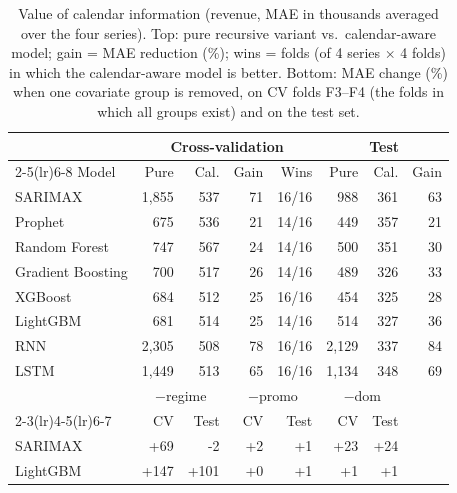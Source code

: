 \begin{table}[t]\centering
\caption{Value of calendar information (revenue, MAE in thousands averaged over the four series). Top: pure recursive variant vs.\ calendar-aware model; gain = MAE reduction (\%); wins = folds (of 4 series $\times$ 4 folds) in which the calendar-aware model is better. Bottom: MAE change (\%) when one covariate group is removed, on CV folds F3--F4 (the folds in which all groups exist) and on the test set.}\label{tab:ablation}
\footnotesize\setlength{\tabcolsep}{3pt}
\begin{tabular}{@{}l rrrr rrr@{}}
\toprule
 & \multicolumn{4}{c}{Cross-validation} & \multicolumn{3}{c}{Test} \\
\cmidrule(lr){2-5}\cmidrule(lr){6-8}
Model & Pure & Cal. & Gain & Wins & Pure & Cal. & Gain \\
\midrule
SARIMAX & 1{,}855 & 537 & 71 & 16/16 & 988 & 361 & 63 \\
Prophet & 675 & 536 & 21 & 14/16 & 449 & 357 & 21 \\
Random Forest & 747 & 567 & 24 & 14/16 & 500 & 351 & 30 \\
Gradient Boosting & 700 & 517 & 26 & 14/16 & 489 & 326 & 33 \\
XGBoost & 684 & 512 & 25 & 16/16 & 454 & 325 & 28 \\
LightGBM & 681 & 514 & 25 & 14/16 & 514 & 327 & 36 \\
RNN & 2{,}305 & 508 & 78 & 16/16 & 2{,}129 & 337 & 84 \\
LSTM & 1{,}449 & 513 & 65 & 16/16 & 1{,}134 & 348 & 69 \\
\midrule
 & \multicolumn{2}{c}{$-$regime} & \multicolumn{2}{c}{$-$promo} & \multicolumn{2}{c}{$-$dom} & \\
\cmidrule(lr){2-3}\cmidrule(lr){4-5}\cmidrule(lr){6-7}
 & CV & Test & CV & Test & CV & Test & \\
\midrule
SARIMAX & +69 & -2 & +2 & +1 & +23 & +24 & \\
LightGBM & +147 & +101 & +0 & +1 & +1 & +1 & \\
\bottomrule
\end{tabular}
\end{table}
